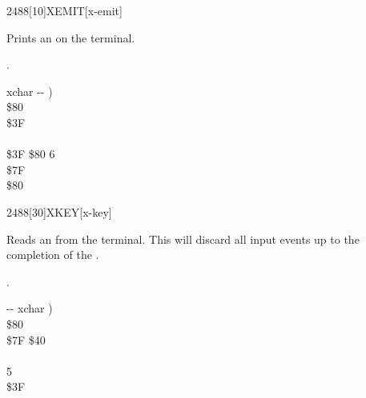 \vspace*{-0.5ex}
\begin{worddef}{2488}[10]{XEMIT}[x-emit]
\item {}

	Prints an  on the terminal.

\see {}.

	\begin{implement}
	\word{:}   xchar -{}- ) \\
	\tab {} \$80        \\
	  \$3F \\
	\tab {}    \\
	\tab[2]    \$3F  \$80   6   \\
	\tab {} \$7F    \\
	\tab {}  \$80      \\
	\word{;}
	\end{implement}
\end{worddef}


\vspace*{-0.5ex}
\begin{worddef}{2488}[30]{XKEY}[x-key]
\item {}

	Reads an  from the terminal.  This will discard all input
	events up to the completion of the \param{xchar}.

\see {}.

	\begin{implement}
	\word{:}   -{}- xchar ) \\
	\tab {}  \$80       \\
	\tab \$7F  \$40  \\
	\tab {}       \\
	   5     \\
	\tab[2] \$3F    \\
	\tab {}   \word{;}
	\end{implement}
\end{worddef}


